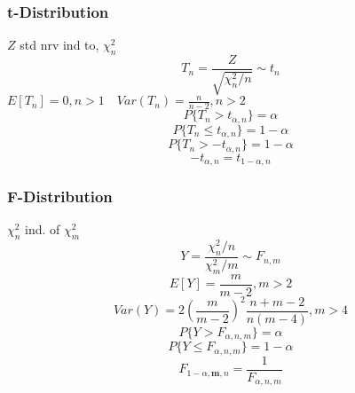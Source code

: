 \subsubsection{t-Distribution}
$Z$ std nrv ind to, $\chi_n^2$
$$T_n = \frac{Z}{\sqrt{\chi_n^2/n}} \sim t_n$$
$E[T_n] = 0, n>1 \quad Var(T_n) = \frac{n}{n-2}, n>2$
$$P\{T_n > t_{\alpha,n}\} = \alpha$$
$$P\{T_n \leq t_{\alpha,n}\} = 1- \alpha$$
$$P\{T_n > -t_{\alpha,n}\} = 1- \alpha$$
$$-t_{\alpha, n} = t_{1-\alpha, n}$$
\subsubsection{F-Distribution}
$\chi_n^2$ ind. of $\chi_m^2$
$$Y=\frac{\chi_n^2/n}{\chi_m^2/m} \sim F_{n,m}$$
$$E[Y] = \frac{m}{m-2}, m>2$$
$$Var(Y) = 2 \left(\frac{m}{m-2}\right)^2\frac{n+m-2}{n(m-4)}, m>4$$
$$P\{Y > F_{\alpha,n,m}\} = \alpha$$
$$P\{Y \leq F_{\alpha,n,m}\} = 1-\alpha$$
$$F_{1-\alpha,\textbf{m},n} = \frac{1}{F_{\alpha,n,m}}$$
